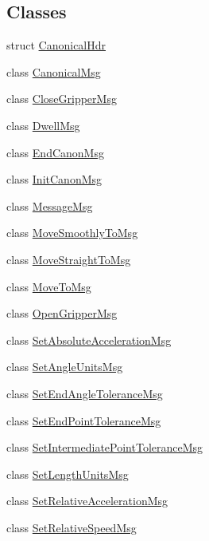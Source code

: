 \subsection*{Classes}
\begin{DoxyCompactItemize}
\item 
struct \hyperlink{struct_canonical_hdr}{CanonicalHdr}
\item 
class \hyperlink{class_canonical_msg}{CanonicalMsg}
\item 
class \hyperlink{class_close_gripper_msg}{CloseGripperMsg}
\item 
class \hyperlink{class_dwell_msg}{DwellMsg}
\item 
class \hyperlink{class_end_canon_msg}{EndCanonMsg}
\item 
class \hyperlink{class_init_canon_msg}{InitCanonMsg}
\item 
class \hyperlink{class_message_msg}{MessageMsg}
\item 
class \hyperlink{class_move_smoothly_to_msg}{MoveSmoothlyToMsg}
\item 
class \hyperlink{class_move_straight_to_msg}{MoveStraightToMsg}
\item 
class \hyperlink{class_move_to_msg}{MoveToMsg}
\item 
class \hyperlink{class_open_gripper_msg}{OpenGripperMsg}
\item 
class \hyperlink{class_set_absolute_acceleration_msg}{SetAbsoluteAccelerationMsg}
\item 
class \hyperlink{class_set_angle_units_msg}{SetAngleUnitsMsg}
\item 
class \hyperlink{class_set_end_angle_tolerance_msg}{SetEndAngleToleranceMsg}
\item 
class \hyperlink{class_set_end_point_tolerance_msg}{SetEndPointToleranceMsg}
\item 
class \hyperlink{class_set_intermediate_point_tolerance_msg}{SetIntermediatePointToleranceMsg}
\item 
class \hyperlink{class_set_length_units_msg}{SetLengthUnitsMsg}
\item 
class \hyperlink{class_set_relative_acceleration_msg}{SetRelativeAccelerationMsg}
\item 
class \hyperlink{class_set_relative_speed_msg}{SetRelativeSpeedMsg}
\end{DoxyCompactItemize}
